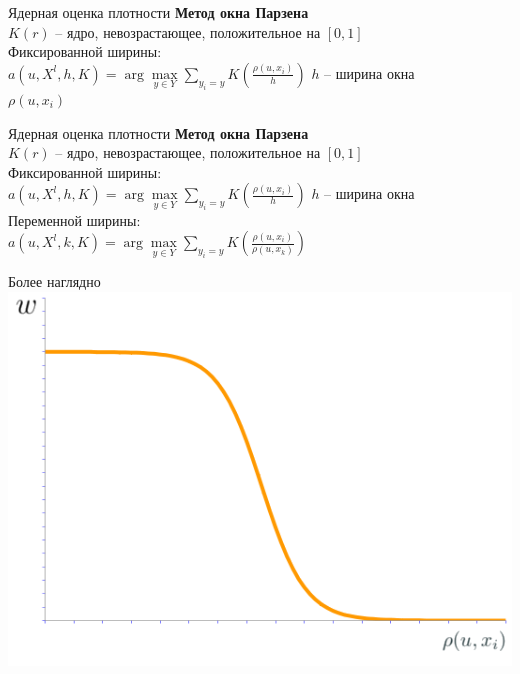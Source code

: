 \documentclass[10pt]{beamer}
\begin{document}
\begin{frame}{Ядерная оценка плотности}
	\textbf{Метод окна Парзена}\\
	$K(r)$ -- ядро, невозрастающее, положительное на ${[0, 1]}$\\
	\bigbreak
	Фиксированной ширины:\\
	${a(u, X^l, h, K) = \arg\max\limits_{y \in Y} \sum\limits_{y_i = y} K(\frac{\rho(u, x_i)}{h})}$ \hspace{5mm} $h$ -- ширина окна\\
	
	$\rho(u, x_i)$
\end{frame}

\begin{frame}{Ядерная оценка плотности}
	\textbf{Метод окна Парзена}\\
  $K(r)$ -- ядро, невозрастающее, положительное на ${[0, 1]}$\\
  \bigbreak
	Фиксированной ширины:\\
	${a(u, X^l, h, K) = \arg\max\limits_{y \in Y} \sum\limits_{y_i = y} K(\frac{\rho(u, x_i)}{h})}$  \hspace{5mm}  $h$ -- ширина окна\\
  \bigbreak
	Переменной ширины:\\
	${a(u, X^l, k, K) = \arg\max\limits_{y \in Y} \sum\limits_{y_i = y}  K(\frac{\rho(u, x_i)}{\rho(u, x_{k})})}$
\end{frame}

\begin{frame}{Более наглядно}
    \centering
	\includegraphics[width=\linewidth,height=\textheight,keepaspectratio]{images/parzen}
\end{frame}
\end{document}
